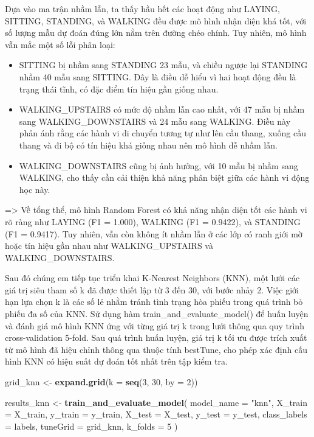 \documentclass[
]{article}
\newenvironment{Shaded}{\begin{snugshade}}{\end{snugshade}}
\newcommand{\AttributeTok}[1]{\textcolor[rgb]{0.13,0.29,0.53}{#1}}
\newcommand{\DecValTok}[1]{\textcolor[rgb]{0.00,0.00,0.81}{#1}}
\newcommand{\FunctionTok}[1]{\textcolor[rgb]{0.13,0.29,0.53}{\textbf{#1}}}
\newcommand{\NormalTok}[1]{#1}
\newcommand{\OtherTok}[1]{\textcolor[rgb]{0.56,0.35,0.01}{#1}}
\newcommand{\StringTok}[1]{\textcolor[rgb]{0.31,0.60,0.02}{#1}}
\begin{document}
Dựa vào ma trận nhầm lẫn, ta thấy hầu hết các hoạt động như LAYING,
SITTING, STANDING, và WALKING đều được mô hình nhận diện khá tốt, với số
lượng mẫu dự đoán đúng lớn nằm trên đường chéo chính. Tuy nhiên, mô hình
vẫn mắc một số lỗi phân loại:

\begin{itemize}
\item
  SITTING bị nhầm sang STANDING 23 mẫu, và chiều ngược lại STANDING nhầm
  40 mẫu sang SITTING. Đây là điều dễ hiểu vì hai hoạt động đều là trạng
  thái tĩnh, có đặc điểm tín hiệu gần giống nhau.
\item
  WALKING\_UPSTAIRS có mức độ nhầm lẫn cao nhất, với 47 mẫu bị nhầm sang
  WALKING\_DOWNSTAIRS và 24 mẫu sang WALKING. Điều này phản ánh rằng các
  hành vi di chuyển tương tự như lên cầu thang, xuống cầu thang và đi bộ
  có tín hiệu khá giống nhau nên mô hình dễ nhầm lẫn.
\item
  WALKING\_DOWNSTAIRS cũng bị ảnh hưởng, với 10 mẫu bị nhầm sang
  WALKING, cho thấy cần cải thiện khả năng phân biệt giữa các hành vi
  động học này.
\end{itemize}

=\textgreater{} Về tổng thể, mô hình Random Forest có khả năng nhận diện
tốt các hành vi rõ ràng như LAYING (F1 = 1.000), WALKING (F1 = 0.9422),
và STANDING (F1 = 0.9417). Tuy nhiên, vẫn còn không ít nhầm lẫn ở các
lớp có ranh giới mờ hoặc tín hiệu gần nhau như WALKING\_UPSTAIRS và
WALKING\_DOWNSTAIRS.

Sau đó chúng em tiếp tục triển khai K-Nearest Neighbors (KNN), một lưới
các giá trị siêu tham số k đã được thiết lập từ 3 đến 30, với bước nhảy
2. Việc giới hạn lựa chọn k là các số lẻ nhằm tránh tình trạng hòa phiếu
trong quá trình bỏ phiếu đa số của KNN. Sử dụng hàm
train\_and\_evaluate\_model() để huấn luyện và đánh giá mô hình KNN ứng
với từng giá trị k trong lưới thông qua quy trình cross-validation
5-fold. Sau quá trình huấn luyện, giá trị k tối ưu được trích xuất từ mô
hình đã hiệu chỉnh thông qua thuộc tính bestTune, cho phép xác định cấu
hình KNN có hiệu suất dự đoán tốt nhất trên tập kiểm tra.

\begin{Shaded}
\begin{Highlighting}[]
\NormalTok{grid\_knn }\OtherTok{\textless{}{-}} \FunctionTok{expand.grid}\NormalTok{(}\AttributeTok{k =} \FunctionTok{seq}\NormalTok{(}\DecValTok{3}\NormalTok{, }\DecValTok{30}\NormalTok{, }\AttributeTok{by =} \DecValTok{2}\NormalTok{))  }

\NormalTok{results\_knn }\OtherTok{\textless{}{-}} \FunctionTok{train\_and\_evaluate\_model}\NormalTok{(}
  \AttributeTok{model\_name =} \StringTok{"knn"}\NormalTok{,}
  \AttributeTok{X\_train =}\NormalTok{ X\_train, }
  \AttributeTok{y\_train =}\NormalTok{ y\_train,}
  \AttributeTok{X\_test =}\NormalTok{ X\_test, }
  \AttributeTok{y\_test =}\NormalTok{ y\_test,}
  \AttributeTok{class\_labels =}\NormalTok{ labels,}
  \AttributeTok{tuneGrid =}\NormalTok{ grid\_knn,}
  \AttributeTok{k\_folds =} \DecValTok{5}
\NormalTok{)}
\end{Highlighting}
\end{Shaded}
\end{document}
